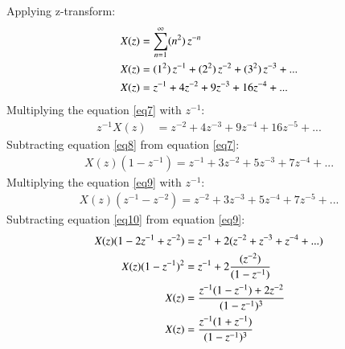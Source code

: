 \documentclass[journal,12pt,twocolumn]{IEEEtran}
\theoremstyle{remark}
\begin{document}
Applying z-transform:
\begin{align}
X(z)&= \sum_{n=1}^\infty (n^2)\,z^{-n}\notag\\
X(z)&=(1^2)\,z^{-1}+(2^2)\,z^{-2}+(3^2)\,z^{-3}+...\notag\\
X(z)&=z^{-1}+4z^{-2}+9z^{-3}+16z^{-4}+...\label{eq7}
\end{align}
Multiplying the equation \ref{eq7} with $z^{-1}$:\\
\begin{align}
z^{-1}X(z)&=z^{-2}+4z^{-3}+9z^{-4}+16z^{-5}+...\label{eq8}
\end{align}
Subtracting equation \ref{eq8} from equation \ref{eq7}:
\begin{align}
X(z)(1-z^{-1})=z^{-1}+3z^{-2}+5z^{-3}+7z^{-4}+...\label{eq9}
\end{align}
Multiplying the equation \ref{eq9} with $z^{-1}$:
\begin{align}
X(z)(z^{-1}-z^{-2})=z^{-2}+3z^{-3}+5z^{-4}+7z^{-5}+...\label{eq10}
\end{align}
Subtracting equation \ref{eq10} from equation \ref{eq9}:
\begin{align}
X(z)(1-2z^{-1}+z^{-2})&=z^{-1}+2(z^{-2}+z^{-3}+z^{-4}+...)\notag\\
X(z)(1-z^{-1})^2&=z^{-1}+2\frac{(z^{-2})}{(1-z^{-1})}\notag\\
X(z)&=\frac{z^{-1}(1-z^{-1})+2z^{-2}}{(1-z^{-1})^3}\notag\\
X(z)&=\frac{z^{-1}(1+z^{-1})}{(1-z^{-1})^3}
\end{align}
\end{document}
